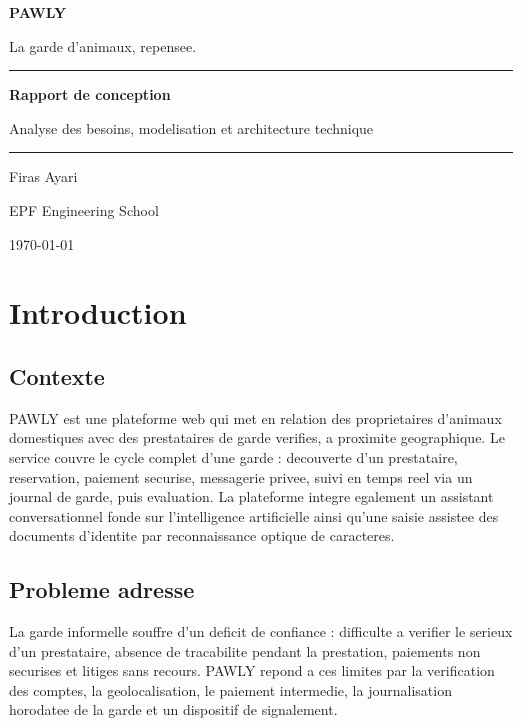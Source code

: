 \documentclass[11pt,a4paper]{article}
\begin{document}
\begin{titlepage}
\centering
\vspace*{3cm}
{\Huge\bfseries PAWLY\par}
\vspace{0.4cm}
{\large La garde d'animaux, repensee.\par}
\vspace{2.5cm}
\rule{0.6\linewidth}{0.8pt}\par
\vspace{0.8cm}
{\LARGE\bfseries Rapport de conception\par}
\vspace{0.4cm}
{\large Analyse des besoins, modelisation et architecture technique\par}
\vspace{2.5cm}
\rule{0.6\linewidth}{0.8pt}\par
\vfill
{\large Firas Ayari\par}
\vspace{0.2cm}
{\color{inkgray}EPF Engineering School\par}
\vspace{0.2cm}
{\color{inkgray}\today\par}
\end{titlepage}

\tableofcontents
\thispagestyle{fancy}
\clearpage

\section{Introduction}

\subsection{Contexte}
PAWLY est une plateforme web qui met en relation des proprietaires d'animaux
domestiques avec des prestataires de garde verifies, a proximite geographique.
Le service couvre le cycle complet d'une garde : decouverte d'un prestataire,
reservation, paiement securise, messagerie privee, suivi en temps reel via un
journal de garde, puis evaluation. La plateforme integre egalement un assistant
conversationnel fonde sur l'intelligence artificielle ainsi qu'une saisie
assistee des documents d'identite par reconnaissance optique de caracteres.

\subsection{Probleme adresse}
La garde informelle souffre d'un deficit de confiance : difficulte a verifier le
serieux d'un prestataire, absence de tracabilite pendant la prestation,
paiements non securises et litiges sans recours. PAWLY repond a ces limites par
la verification des comptes, la geolocalisation, le paiement intermedie, la
journalisation horodatee de la garde et un dispositif de signalement.
\end{document}
